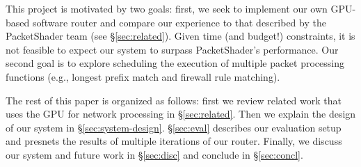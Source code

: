 This project is motivated by two goals: first, we seek to implement our own
GPU-based software router and compare our experience to that described by the
PacketShader team (see \S\ref{sec:related}). Given time (and budget!)
constraints, it is not feasible to expect our system to surpass PacketShader's
performance. Our second goal is to explore scheduling the execution of multiple
packet processing functions (e.g., longest prefix match and firewall rule
matching).

The rest of this paper is organized as follows: first we review related work
that uses the GPU for network processing in \S\ref{sec:related}. Then we
explain the design of our system in \S\ref{sec:system-design}. \S\ref{sec:eval}
describes our evaluation setup and presnets the results of multiple iterations
of our router. Finally, we discuss our system and future work in
\S\ref{sec:disc} and conclude in \S\ref{sec:concl}.
